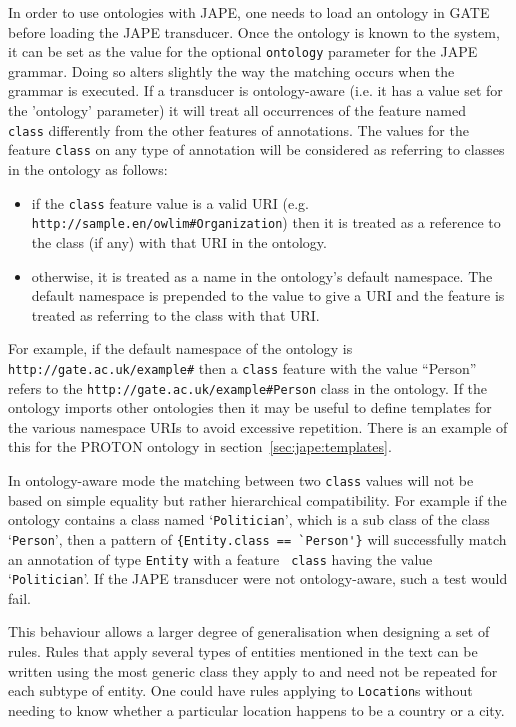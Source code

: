 {In order to use ontologies with JAPE, one needs to load an ontology in GATE
before loading the JAPE transducer. Once the ontology is known to the system, it
can be set as the value for the optional {\tt ontology} parameter for the JAPE
grammar. Doing so alters slightly the way the matching occurs when the grammar
is executed. If a transducer is ontology-aware (i.e. it has a value set for the
'ontology' parameter) it will treat all occurrences of the feature named {\tt
class} differently from the other features of annotations.  The values for the
feature {\tt class} on any type of annotation will be considered as referring
to classes in the ontology as follows:
\begin{itemize}
\item if the {\tt class} feature value is a valid URI (e.g.
  \verb|http://sample.en/owlim#Organization|) then it is treated as a reference
  to the class (if any) with that URI in the ontology.
\item otherwise, it is treated as a name in the ontology's default namespace.
  The default namespace is prepended to the value to give a URI and the feature
  is treated as referring to the class with that URI.
\end{itemize}
%
For example, if the default namespace of the ontology is
\verb|http://gate.ac.uk/example#| then a {\tt class} feature with the value
``Person'' refers to the \verb|http://gate.ac.uk/example#Person| class in the
ontology.  If the ontology imports other ontologies then it may be useful to
define templates for the various namespace URIs to avoid excessive repetition.
There is an example of this for the PROTON ontology in
section~\ref{sec:jape:templates}.

In ontology-aware mode the matching between two {\tt class} values will not
be based on simple equality but rather hierarchical compatibility. For example
if the ontology contains a class named `{\tt Politician}', which is a sub class
of the class `{\tt Person}', then a pattern of \verb!{Entity.class == `Person'}!
will successfully match an annotation of type {\tt Entity} with a feature {\tt
class} having the value `{\tt Politician}'. If the JAPE transducer were not
ontology-aware, such a test would fail. 

This behaviour allows a larger degree of generalisation when designing a set of
rules. Rules that apply several types of entities mentioned in the text can be
written using the most generic class they apply to and need not be repeated for
each subtype of entity. One could have rules applying to {\tt Location}s without
needing to know whether a particular location happens to be a country or a city.

}
